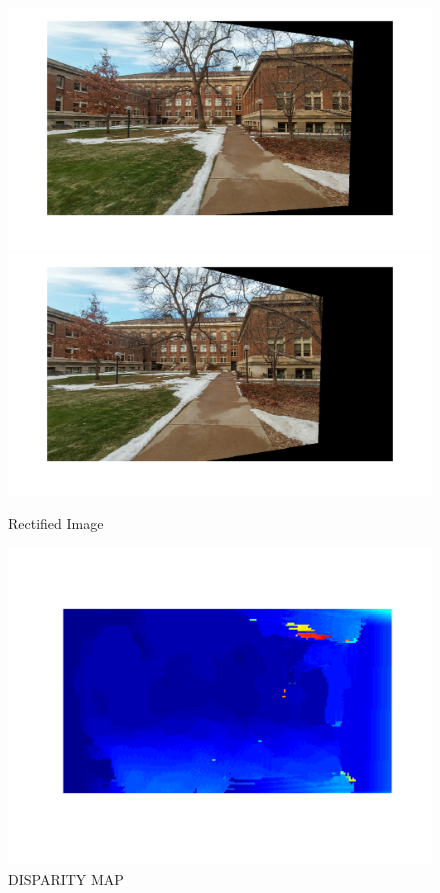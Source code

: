 \documentclass[letter, 10pt]{article}
\begin{document}
\begin{figure}[H]
        \centering
        \includegraphics[width=\textwidth]{HW5/RESULT/im1_w.png}
    \endminipage\hfill
        \centering
        \includegraphics[width=\textwidth]{HW5/RESULT/im2_w.png}
    \endminipage\hfill
    \caption{Rectified Image}
\end{figure}

\begin{figure}[H]
    \centering
    \includegraphics[width=\textwidth]{HW5/RESULT/disp.png}
    \caption{DISPARITY MAP}
    \label{fig:my_label}
\end{figure}
\end{document}
